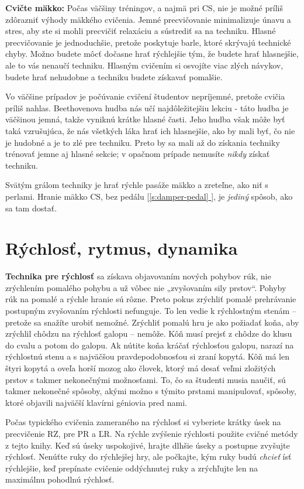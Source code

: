 \documentclass[11pt,a4paper]{book}
\newcommand*{\fullref}[1]{\hyperref[{#1}]{\ref*{#1} \nameref*{#1}}} %
\newcommand*{\fullrefp}[1]{[\fullref{#1}]} %
\begin{document}
\textbf{Cvičte mäkko:} Počas väčšiny tréningov, a najmä pri CS, nie je možné príliš zdôrazniť výhody mäkkého cvičenia. Jemné precvičovanie minimalizuje únavu a stres, aby ste si mohli precvičiť relaxáciu a sústrediť sa na techniku. Hlasné precvičovanie je jednoduchšie, pretože poskytuje barle, ktoré skrývajú technické chyby. Možno budete môcť dočasne hrať rýchlejšie tým, že budete hrať hlasnejšie, ale to vás nenaučí techniku. Hlasným cvičením si osvojíte viac zlých návykov, budete hrať nehudobne a techniku budete získavať pomalšie.

Vo väčšine prípadov je počúvanie cvičení študentov nepríjemné, pretože cvičia príliš nahlas. Beethovenova hudba nás učí najdôležitejšiu lekciu - táto hudba je väčšinou jemná, takže vyniknú krátke hlasné časti. Jeho hudba však môže byť taká vzrušujúca, že nás všetkých láka hrať ich hlasnejšie, ako by mali byť, čo nie je hudobné a je to zlé pre techniku. Preto by sa mali až do získania techniky trénovať jemne aj hlasné sekcie; v opačnom prípade nemusíte \emph{nikdy} získať techniku.

Svätým grálom techniky je hrať rýchle pasáže mäkko a zreteľne, ako niť s perlami. Hranie mäkko CS, bez pedálu \fullrefp{s:damper-pedal}, je \emph{jediný} spôsob, ako sa tam dostať.

\section{Rýchlosť, rytmus, dynamika}\label{s:speed}
\textbf{Technika pre rýchlosť} sa získava objavovaním nových pohybov rúk, nie zrýchlením pomalého pohybu a už vôbec nie „zvyšovaním sily prstov“. Pohyby rúk na pomalé a rýchle hranie sú rôzne. Preto pokus zrýchliť pomalé prehrávanie postupným zvyšovaním rýchlosti nefunguje. To len vedie k rýchlostným stenám – pretože sa snažíte urobiť nemožné. Zrýchliť pomalú hru je ako požiadať koňa, aby zrýchlil chôdzu na rýchlosť galopu – nemôže. Kôň musí prejsť z chôdze do klusu do cvalu a potom do galopu. Ak nútite koňa kráčať rýchlosťou galopu, narazí na rýchlostnú stenu a s najväčšou pravdepodobnosťou si zraní kopytá. Kôň má len štyri kopytá a oveľa horší mozog ako človek, ktorý má desať veľmi zložitých prstov s takmer nekonečnými možnosťami. To, čo sa študenti musia naučiť, sú takmer nekonečné spôsoby, akými možno s týmito prstami manipulovať, spôsoby, ktoré objavili najväčší klavírni géniovia pred nami.

Počas typického cvičenia zameraného na rýchlosť si vyberiete krátky úsek na precvičenie RZ, pre PR a ĽR. Na rýchle zvýšenie rýchlosti použite cvičné metódy z tejto knihy. Keď sú úseky uspokojivé, hrajte dlhšie úseky a postupne zvyšujte rýchlosť. Nenúťte ruky do rýchlejšej hry, ale počkajte, kým ruky budú \emph{chcieť} ísť rýchlejšie, keď prepínate cvičenie oddýchnutej ruky a zrýchľujte len na maximálnu pohodlnú rýchlosť. 
 
\end{document}
